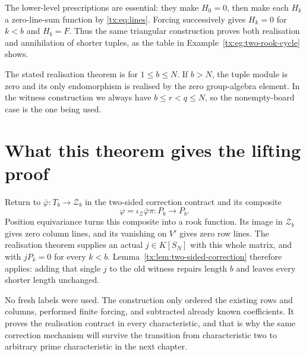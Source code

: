 The lower-level prescriptions are essential: they make $H_0=0$, then make each $H_k$ a zero-line-sum function by \eqref{tx:eq:lines}. Forcing successively gives $H_k=0$ for $k<b$ and $H_b=F$. Thus the same triangular construction proves both realisation and annihilation of shorter tuples, as the table in Example~\ref{tx:eg:two-rook-cycle} shows.

The stated realisation theorem is for $1\le b\le N$. If $b>N$,
the tuple module is zero and its only endomorphism is realised by
the zero group-algebra element. In the witness construction we
always have $b\le r<q\le N$, so the nonempty-board case is the
one being used.

\section*{What this theorem gives the lifting proof}
Return to $\bar\varphi:T_b\to\mathcal Z_b$ in the two-sided correction contract and its composite
\[
             \varphi=\iota_{\mathcal Z}\bar\varphi\pi:P_b\to P_b.
\]
Position equivariance turns this composite into a rook function. Its image in
$\mathcal Z_b$ gives zero column lines, and its vanishing on $V'$
gives zero row lines. The realisation theorem supplies an actual
$j\in K[S_N]$ with this whole matrix, and with $jP_k=0$ for every
$k<b$. Lemma~\ref{tx:lem:two-sided-correction} therefore applies: adding that single $j$ to the old witness repairs length $b$ and leaves every shorter length unchanged.

No fresh labels were used. The construction only ordered the
existing rows and columns, performed finite forcing, and subtracted
already known coefficients. It proves the realisation contract in
every characteristic, and that is why the same correction mechanism
will survive the transition from characteristic two to arbitrary
prime characteristic in the next chapter.
